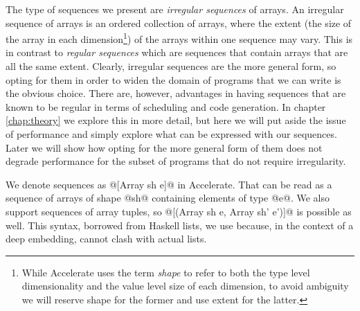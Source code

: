The type of sequences we present are \emph{irregular sequences} of arrays. An irregular sequence of arrays is an ordered collection of arrays, where the extent (the size of the array in each dimension\footnote{While Accelerate uses the term \emph{shape} to refer to both the type level dimensionality and the value level size of each dimension, to avoid ambiguity we will reserve shape for the former and use extent for the latter.}) of the arrays within one sequence may vary. This is in contrast to \emph{regular sequences} which are sequences that contain arrays that are all the same extent. Clearly, irregular sequences are the more general form, so opting for them in order to widen the domain of programs that we can write is the obvious choice. There are, however, advantages in having sequences that are known to be regular in terms of scheduling and code generation. In chapter \ref{chap:theory} we explore this in more detail, but here we will put aside the issue of performance and simply explore what can be expressed with our sequences. Later we will show how opting for the more general form of them does not degrade performance for the subset of programs that do not require irregularity.

We denote sequences as @[Array sh e]@ in Accelerate. That can be read as a sequence of arrays of shape @sh@ containing elements of type @e@. We also support sequences of array tuples, so @[(Array sh e, Array sh' e')]@ is possible as well. This syntax, borrowed from Haskell lists, we use because, in the context of a deep embedding, cannot clash with actual lists. %




